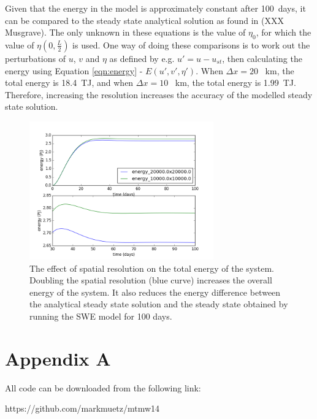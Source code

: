 \documentclass{article}
\begin{document}
Given that the energy in the model is approximately constant after \SI{100}{days}, it can be
compared to the steady state analytical solution as found in (XXX Musgrave). The only unknown in
these equations is the value of $\eta_0$, for which the value of $\eta(0, \frac{L}{2})$ is used. 
One way of doing these comparisons is to work out the perturbations of $u$, $v$ and $\eta$ as
defined by e.g. $u' = u - u_{st}$, then calculating the energy using Equation \ref{eqn:energy} -
$E(u', v', \eta')$. When $\Delta x = 20$ \SI{}{km}, the total energy is \SI{18.4}{TJ}, and when
$\Delta x = 10$ \SI{}{km}, the total energy is \SI{1.99}{TJ}. Therefore, increasing the resolution
increases the accuracy of the modelled steady state solution.

\begin{figure}[ht!]
    \centering
    \includegraphics[width=300px]{figures/task_b_energy}
    \caption{The effect of spatial resolution on the total energy of the system. Doubling the
    spatial resolution (blue curve) increases the overall energy of the system. It also reduces the
energy difference between the analytical steady state solution and the steady state obtained by
running the SWE model for 100 days.}
    \label{fig:task_b_energy}
\end{figure}

\section*{Appendix A}

All code can be downloaded from the following link:

https://github.com/markmuetz/mtmw14
\end{document}
